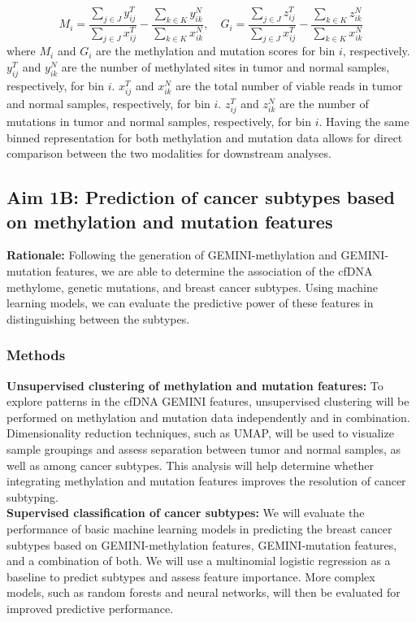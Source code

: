 \documentclass[11pt]{article}
\begin{document}
\begin{equation}
	M_{i} = \frac{\sum\limits_{j \in J}{y^{T}_{ij}}}{\sum\limits_{j \in J}{x^{T}_{ij}}} - 
	\frac{\sum\limits_{k \in K}{y^{N}_{ik}}}{\sum\limits_{k \in K}{x^{N}_{ik}}},
	\quad
	G_{i} = \frac{\sum\limits_{j \in J}{z^{T}_{ij}}}{\sum\limits_{j \in J}{x^{T}_{ij}}} - 
	\frac{\sum\limits_{k \in K}{z^{N}_{ik}}}{\sum\limits_{k \in K}{x^{N}_{ik}}}
\end{equation}
where $M_{i}$ and $G_{i}$ are the methylation and mutation scores for bin $i$, respectively. 
$y^{T}_{ij}$ and $y^{N}_{ik}$ are the number of methylated sites in tumor and normal samples, respectively, for bin $i$.
$x^{T}_{ij}$ and $x^{N}_{ik}$ are the total number of viable reads in tumor and normal samples, respectively, for bin $i$.
$z^{T}_{ij}$ and $z^{N}_{ik}$ are the number of mutations in tumor and normal samples, respectively, for bin $i$.
Having the same binned representation for both methylation and mutation data allows for direct comparison between the two modalities for downstream analyses.


\subsection*{Aim 1B: Prediction of cancer subtypes based on methylation and mutation features}
\textbf{Rationale:}
Following the generation of GEMINI-methylation and GEMINI-mutation features,
we are able to determine the association of the cfDNA methylome, genetic mutations,
and breast cancer subtypes. Using machine learning models, we can evaluate the 
predictive power of these features in distinguishing between the subtypes.
\subsubsection*{Methods}
\textbf{Unsupervised clustering of methylation and mutation features:}
To explore patterns in the cfDNA GEMINI features, unsupervised clustering will be performed on methylation and mutation data independently and in combination. Dimensionality reduction techniques, such as UMAP, will be used to visualize sample groupings and assess separation between tumor and normal samples, as well as among cancer subtypes. This analysis will help determine whether integrating methylation and mutation features improves the resolution of cancer subtyping.
\medskip \\
\textbf{Supervised classification of cancer subtypes:}
We will evaluate the performance of basic machine learning models in predicting the 
breast cancer subtypes based on GEMINI-methylation features, GEMINI-mutation features, and a combination of both. 
We will use a multinomial logistic regression as a baseline to predict subtypes and assess feature importance. More complex models, such as random forests and neural networks, will then be evaluated for improved predictive performance.
\end{document}
